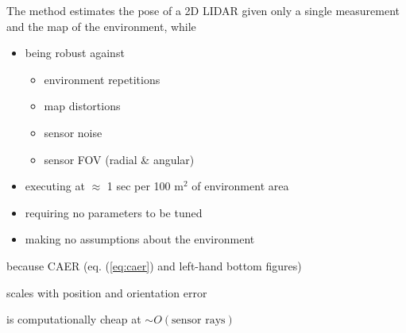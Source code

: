 \vspace{5em}


\begin{center}
{\LARGE
The method estimates the pose of a 2D LIDAR given only a single
measurement and the map of the environment, while
\begin{itemize}
  \item \noindent{}
  {%
    being robust against
    \begin{itemize}\Large
      \item environment repetitions
      \item map distortions
      \item sensor noise
      \item sensor FOV (radial \& angular)
    \end{itemize}
  \endminipage
  }
  \item executing at $\approx$ 1 sec per 100 m$^2$ of environment area
  \item requiring no parameters to be tuned
  \item making no assumptions about the environment
\end{itemize}
\vspace{0.5\baselineskip}
because CAER (eq. (\ref{eq:caer}) and left-hand bottom figures)
\vspace{0.5\baselineskip}
\begin{itemize}\hspace{0.25\baselineskip}
  {%
\item scales with position and orientation error
   \item is computationally cheap at $\sim O(\text{sensor rays})$
  \endminipage
  }
\end{itemize}
}
\end{center}

\vspace{0.5\baselineskip}
\begin{center}
  \noindent\makebox[\linewidth]{\textcolor[RGB]{122 125 127}{\rule{0.1\paperwidth}{0.4pt} $\diamond[-7.5pt]$ \rule{0.1\paperwidth}{0.4pt}}}
\end{center}

